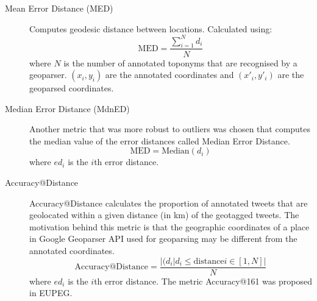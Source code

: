 \begin{description}
    \item[Mean Error Distance (MED)]
    Computes geodesic distance between locations. Calculated using:
    \begin{equation}
      \text{MED} = \frac{\sum_{i=1}^{N} d_i}{N}
    \end{equation}
    where $N$ is the number of annotated toponyms that are recognised by a geoparser. $(x_i, y_i)$ are the annotated coordinates and $(x'_i, y'_i)$ are the geoparsed coordinates.

    \item[Median Error Distance (MdnED)]
    Another metric that was more robust to outliers was chosen that computes the median value of the error distances called Median Error Distance.
    \begin{equation}
      \text{MED} = \text{Median}({d_i})
    \end{equation}
    where $ed_i$ is the $i$th error distance.

    \item[Accuracy@Distance]
    Accuracy@Distance calculates the proportion of annotated tweets that are geolocated within a given distance (in km) of the geotagged tweets. The motivation behind this metric is that the geographic coordinates of a place in Google Geoparser API used for geoparsing may be different from the annotated coordinates.
    \begin{equation}
      \text{Accuracy@Distance} = \frac{|{(d_i | d_i \leq \text{distance} i \in [1, N]}|}{N}
    \end{equation}
    where $ed_i$ is the $i$th error distance.
    The metric Accuracy@161 was proposed in EUPEG.

    

\end{description}